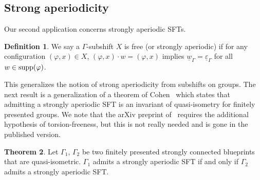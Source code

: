 \documentclass{article}
\theoremstyle{definition}
\newtheorem{theorem}{Theorem}[section] %
\newtheorem{defn}[theorem]{Definition} %
\theoremstyle{definition}
\newcommand{\Fo}{\mathcal{F}}
\newcommand{\QI}{\mathtt{QI}}
\newcommand{\supp}{\textnormal{supp}}
\begin{document}

\subsection{Strong aperiodicity}

Our second application concerns strongly aperiodic SFTs.

\begin{defn}
    We say a $\Gamma$-subshift $X$ is free (or strongly aperiodic) if for any configuration $(\varphi,x)\in X$, $(\varphi, x)\cdot w = (\varphi,x)$ implies $\underline{w}_{\Gamma} = \underline{\varepsilon}_{\Gamma}$ for all $w\in\supp(\varphi)$.
\end{defn}

This generalizes the notion of strong aperiodicity from subshifts on groups. The next result is a generalization of a theorem of Cohen~\cite[Theorem 1.9]{cohen2017large} which states that admitting a strongly aperiodic SFT is an invariant of quasi-isometry for finitely presented groups. We note that the arXiv preprint of~\cite{cohen2017large} requires the additional hypothesis of torsion-freeness, but this is not really needed and is gone in the published version.

\begin{theorem}
\label{thm:SA}
        Let $\Gamma_1$, $\Gamma_2$ be two finitely presented strongly connected blueprints that are quasi-isometric. $\Gamma_1$ admits a strongly aperiodic SFT if and only if $\Gamma_2$ admits a strongly aperiodic SFT.
\end{theorem}
\end{document}
